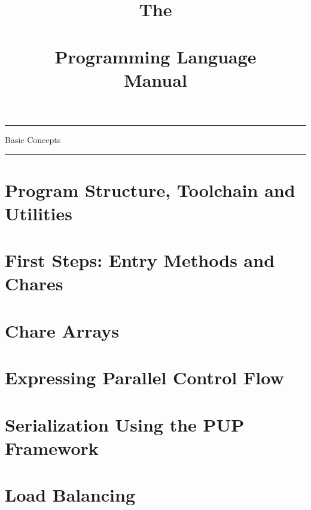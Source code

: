 \documentclass[10pt]{article}
\begin{document}
\title{The\\ \charmpp\\ Programming Language\\ Manual}
\credits{\hspace{0 in}}
\maketitle



\begin{titlepage}%
 \rule{\textwidth}{3pt}
 \vspace{\fill}
 \begin{flushright}
   \textsf{\Huge Basic Concepts \\}
 \end{flushright}
 \vspace{\fill}
 \rule{\textwidth}{3pt}
\end{titlepage}



\section{Program Structure, Toolchain and Utilities}
  	
  
  

\section{First Steps: Entry Methods and Chares}
  	
  
  

\section{Chare Arrays}
  

\section{Expressing Parallel Control Flow}
  

\section{Serialization Using the PUP Framework}
  

\section{Load Balancing}
  
\end{document}
